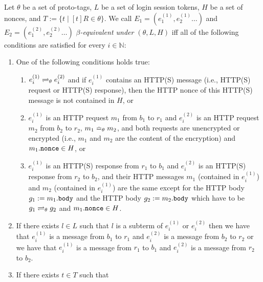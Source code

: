   \begin{definition}\label{def:Events}
    Let $\theta$ be a set of proto-tags, 
    $L$ be a set of login session tokens, 
    $H$ be a set of nonces, and
    $T:=\{t\mid [t]R\in \theta\}$. 
    We call $E_1 = (e_1^{(1)}, e_2^{(1)}\dots)$ and
    $E_2= (e_1^{(2)}, e_2^{(2)} \dots)$ 
    \emph{$\beta$-equivalent under $(\theta, L, H)$} 
    iff all of the following conditions are satisfied for every 
    $i \in \mathbb{N}$:
  
    \begin{enumerate}
      \item\label{eqe:distinction} One of the following conditions holds
        true:
        \begin{enumerate}
        \item\label{eqe:prototagequiv}
          $e_i^{(1)} \rightleftharpoons_{\theta} e_i^{(2)}$ and if $e_i^{(1)}$
          contains an HTTP(S) message (i.e., HTTP(S) request or HTTP(S)
          response), then the HTTP nonce of this HTTP(S) message is not
          contained in $H$, or
        \item\label{eqe:http-req} $e_i^{(1)}$ is an HTTP request $m_1$
          from $b_1$ to $r_1$ and $e_i^{(2)}$ is an HTTP request $m_2$
          from $b_2$ to $r_2$, $m_1 \bumpeq_{\theta} m_2$, and both
          requests are unencrypted or encrypted (i.e., $m_1$ and $m_2$ are
          the content of the encryption) and $m_1.\mathtt{nonce} \in H$, or
        \item\label{eqe:http-res} $e_i^{(1)}$ is an HTTP(S) response from
          $r_1$ to $b_1$ and $e_i^{(2)}$ is an HTTP(S) response from $r_2$
          to $b_2$, and their HTTP messages $m_1$ (contained in
          $e_i^{(1)}$) and $m_2$ (contained in $e_i^{(1)}$) are the same
          except for the HTTP body $g_1 := m_1.\mathtt{body}$ and the HTTP
          body $g_2 := m_2.\mathtt{body}$ which have to be
          $g_1 \rightleftharpoons_{\theta} g_2$ and $m_1.\mathtt{nonce} \in H$.
        \end{enumerate}
      \item\label{eqe:pre:l} If there exists $l \in L$ such that $l$ is a
        subterm of $e_i^{(1)}$ or $e_i^{(2)}$ then we have that
        $e_i^{(1)}$ is a message from $b_1$ to $r_1$ and $e_i^{(2)}$ is a
        message from $b_2$ to $r_2$ or we have that $e_i^{(1)}$ is a
        message from $r_1$ to $b_1$ and $e_i^{(2)}$ is a message from
        $r_2$ to $b_2$.
      \item\label{eqe:pre:t} If there exists $t \in T$ such that

\end{enumerate}
\end{definition}
